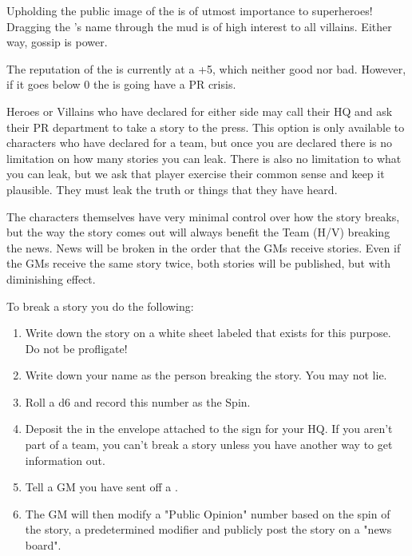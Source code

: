 \documentclass[green]{LRSguildcamp1}
\begin{document}
\name{\gPR{}}

Upholding the public image of the \cHeroLeague{\intro} is of utmost importance to superheroes! 
Dragging the \cHeroLeague{}'s name through the mud is of high interest to all villains. Either way, gossip is power. 

The reputation of the \cHeroLeague{\intro} is currently at a +5, which neither good nor bad. However, if it goes below 0 the \cHeroLeague{} is going have a PR crisis. 

Heroes or Villains who have declared for either side may call their HQ and ask their PR department to take a story to the press. This option is only available to characters who have declared for a team, but once you are declared there is no limitation on how many stories you can leak. There is also no limitation to what you can leak, but we ask that player exercise their common sense and keep it plausible. They must leak the truth or things that they have heard. 

The characters themselves have very minimal control over how the story breaks, but the way the story comes out will always benefit the Team (H/V) breaking the news. News will be broken in the order that the GMs receive stories. Even if the GMs receive the same story twice, both stories will be published, but with diminishing effect. 

To break a story you do the following:
\begin{enumerate}

\item Write down the story on a white sheet labeled \wPressRelease{} that exists for this purpose. Do not be profligate! 

\item Write down your name as the person breaking the story. You may not lie. 

\item Roll a d6 and record this number as the Spin. 

\item Deposit the \wPressRelease{} in the envelope attached to the sign for your HQ. If you aren't part of a team, you can't break a story unless you have another way to get information out. 

\item Tell a GM you have sent off a \wPressRelease{}.

\item The GM will then modify a "Public Opinion" number based on the spin of the story, a predetermined modifier and publicly post the story on a "news board".
\end{enumerate}
\end{document}

